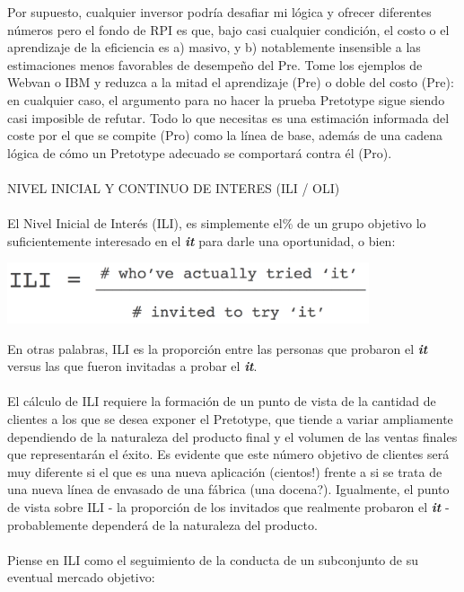 \documentclass{article}
\begin{document}
Por supuesto, cualquier inversor podr\'ia desafiar mi l\'ogica y ofrecer diferentes n\'umeros pero el fondo de RPI es que, bajo casi cualquier condici\'on, el costo o el aprendizaje de la eficiencia es a) masivo, y b) notablemente insensible a las estimaciones menos favorables de desempe\~no del Pre. Tome los ejemplos de Webvan o IBM y reduzca a la mitad el aprendizaje (Pre) o doble del costo (Pre): en cualquier caso, el argumento para no hacer la prueba Pretotype sigue siendo casi imposible de refutar. Todo lo que necesitas es una estimaci\'on informada del coste por el que se compite (Pro) como la l\'inea de base, adem\'as de una cadena l\'ogica de c\'omo un Pretotype adecuado se comportar\'a contra \'el (Pro).
\\ \\
NIVEL INICIAL Y CONTINUO DE INTERES (ILI / OLI)
\\ \\
El Nivel Inicial de Inter\'es (ILI), es simplemente el\% de un grupo objetivo lo suficientemente interesado en el \textbf{\textit{it}} para darle una oportunidad, o bien:

\begin{center}
    \includegraphics[width=0.8\textwidth]{ILI}
\end{center}

En otras palabras, ILI es la proporci\'on entre las personas que probaron el \textbf{\textit{it}} versus las que fueron invitadas a probar el \textbf{\textit{it}}.
\\ \\
El c\'alculo de ILI requiere la formaci\'on de un punto de vista de la cantidad de clientes a los que se desea exponer el Pretotype, que tiende a variar ampliamente dependiendo de la naturaleza del producto final y el volumen de las ventas finales que representar\'an el \'exito. Es evidente que este n\'umero objetivo de clientes ser\'a muy diferente si el que es una nueva aplicaci\'on (cientos!) frente a si se trata de una nueva l\'inea de envasado de una f\'abrica (una docena?). Igualmente, el punto de vista sobre ILI - la proporci\'on de los invitados que realmente probaron el \textbf{\textit{it}} - probablemente depender\'a de la naturaleza del producto.
\\ \\
Piense en ILI como el seguimiento de la conducta de un subconjunto de su eventual mercado objetivo:
\end{document}

